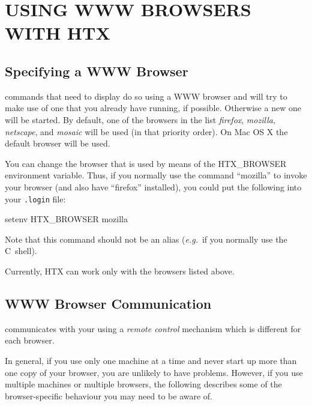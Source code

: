 \documentclass[11pt,nolof]{starlink}
\providecommand{\hi}[1]{{\texttt{#1}}}
\providecommand{\qt}[1]{``#1''}
\providecommand{\st}[1]{{\emph{#1}}}
\begin{document}
\section{\label{sect:usingwwwbrowsers}USING WWW BROWSERS WITH HTX}

\subsection{\label{sect:specifyingabrowser}Specifying a WWW Browser}

 commands that need to display
 do so using a WWW browser
and will try to make use of one that you already have running, if
possible. Otherwise a new one will be started. By default, one of the
browsers in the list \st{firefox}, \st{mozilla}, \st{netscape},
and \st{mosaic} will be used (in that priority order). On Mac OS X
the default browser will be used.

You can change the browser that is used by means of the HTX\_BROWSER
environment variable. Thus, if you normally use the command \qt{mozilla} to
invoke your browser (and also have \qt{firefox} installed), you could put the
following into your \hi{.login} file:

\begin{small}
\begin{terminalv}
setenv HTX_BROWSER mozilla
\end{terminalv}
\end{small}

Note that this command should not be an alias (\st{e.g.}\ if you
normally use the C~shell).

Currently, HTX can work only with the browsers listed above.

\subsection{\label{sect:browsercommunication}WWW Browser Communication}

 communicates with your  using a \st{remote control} mechanism
which is different for each browser.

In general, if you use only one machine at a time and never start up
more than one copy of your browser, you are unlikely to have
problems. However, if you use multiple machines or multiple browsers,
the following describes some of the browser-specific behaviour you may
need to be aware of.
\end{document}
